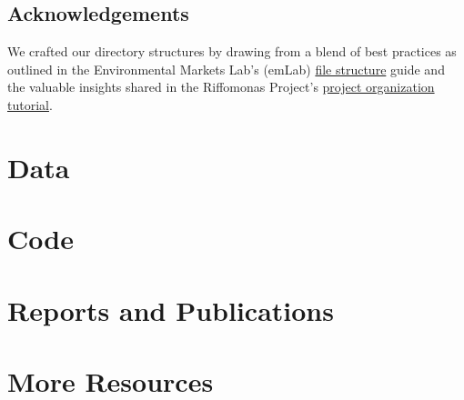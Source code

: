 \documentclass[
  letterpaper,
  DIV=11,
  numbers=noendperiod]{scrreprt}
\begin{document}
\section*{Acknowledgements}\label{acknowledgements}


We crafted our directory structures by drawing from a blend of best
practices as outlined in the Environmental Markets Lab's (emLab)
\href{https://emlab-ucsb.github.io/SOP/2-file-structure.html\#file-structure}{file
structure} guide and the valuable insights shared in the Riffomonas
Project's \href{https://www.youtube.com/watch?v=olu821RTQA8}{project
organization tutorial}.


\chapter*{\texorpdfstring{ Data}{ Data}}\label{sec-data}



\chapter*{\texorpdfstring{ Code}{ Code}}\label{sec-code}



\chapter*{\texorpdfstring{ Reports and
Publications}{ Reports and Publications}}\label{sec-reports-and-publications}



\chapter*{\texorpdfstring{ More
Resources}{ More Resources}}\label{sec-more-resources}
\end{document}
